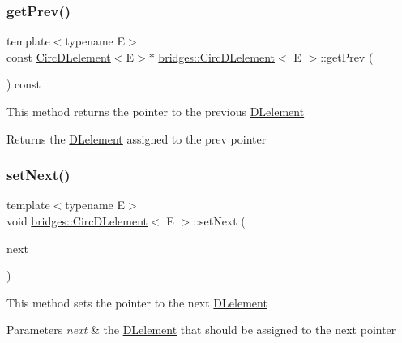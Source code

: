 \subsubsection{\texorpdfstring{get\+Prev()}{getPrev()}}
{\footnotesize\ttfamily template$<$typename E$>$ \\
const \mbox{\hyperlink{classbridges_1_1_circ_d_lelement}{Circ\+D\+Lelement}}$<$E$>$$\ast$ \mbox{\hyperlink{classbridges_1_1_circ_d_lelement}{bridges\+::\+Circ\+D\+Lelement}}$<$ E $>$\+::get\+Prev (\begin{DoxyParamCaption}{ }\end{DoxyParamCaption}) const\hspace{0.3cm}{\ttfamily [inline]}}

This method returns the pointer to the previous \mbox{\hyperlink{classbridges_1_1_d_lelement}{D\+Lelement}} \begin{DoxyReturn}{Returns}
the \mbox{\hyperlink{classbridges_1_1_d_lelement}{D\+Lelement}} assigned to the prev pointer 
\end{DoxyReturn}
\mbox{\label{classbridges_1_1_circ_d_lelement_a0bdf28de82173f2099673d18f6f62810}} 
\subsubsection{\texorpdfstring{set\+Next()}{setNext()}}
{\footnotesize\ttfamily template$<$typename E$>$ \\
void \mbox{\hyperlink{classbridges_1_1_circ_d_lelement}{bridges\+::\+Circ\+D\+Lelement}}$<$ E $>$\+::set\+Next (\begin{DoxyParamCaption}\item[{\mbox{\hyperlink{classbridges_1_1_circ_d_lelement}{Circ\+D\+Lelement}}$<$ E $>$ $\ast$}]{next }\end{DoxyParamCaption})\hspace{0.3cm}{\ttfamily [inline]}}

This method sets the pointer to the next \mbox{\hyperlink{classbridges_1_1_d_lelement}{D\+Lelement}}


\begin{DoxyParams}{Parameters}
{\em next} & the \mbox{\hyperlink{classbridges_1_1_d_lelement}{D\+Lelement}} that should be assigned to the next pointer \\
\hline
\end{DoxyParams}
\mbox{\label{classbridges_1_1_circ_d_lelement_a5b2a0dad47208829bb2c17d8bc0ee74d}} 
